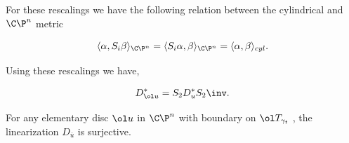 \begin{remark}
\noindent For these rescalings we have the following relation between the cylindrical and $\C\P^n$ metric 

\begin{equation}
        \langle \alpha, S_i \beta \rangle_{\C\P^n}=\langle S_i \alpha,\beta \rangle_{\C\P^n}  = \langle \alpha ,\beta \rangle_{cyl} .
\end{equation}

\noindent Using these rescalings we have, 

\begin{align}
    \label{eq:cokernelrel}
    D^*_{\ol u} = S_2 D_u^* S_2\inv.
\end{align}
     
 \end{remark}
\begin{lemma}
\label{lemm:cyltocompreg}
For any elementary disc $\ol u$ in $\C\P^n$ with boundary on  $\ol T_{\gamma_t}$ ,  the linearization $D_{\overline{u}} $  is surjective.
\end{lemma}

